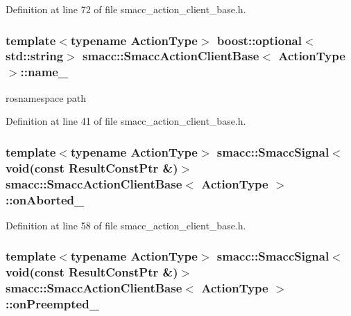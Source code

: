 Definition at line 72 of file smacc\+\_\+action\+\_\+client\+\_\+base.\+h.

\subsubsection[{\texorpdfstring{name\+\_\+}{name_}}]{\setlength{\rightskip}{0pt plus 5cm}template$<$typename Action\+Type$>$ boost\+::optional$<$std\+::string$>$ {\bf smacc\+::\+Smacc\+Action\+Client\+Base}$<$ Action\+Type $>$\+::name\+\_\+}\hypertarget{classsmacc_1_1SmaccActionClientBase_a8464e3ec514e57333339fc538a2203f4}{}\label{classsmacc_1_1SmaccActionClientBase_a8464e3ec514e57333339fc538a2203f4}


rosnamespace path 



Definition at line 41 of file smacc\+\_\+action\+\_\+client\+\_\+base.\+h.

\subsubsection[{\texorpdfstring{on\+Aborted\+\_\+}{onAborted_}}]{\setlength{\rightskip}{0pt plus 5cm}template$<$typename Action\+Type$>$ {\bf smacc\+::\+Smacc\+Signal}$<$void(const Result\+Const\+Ptr \&)$>$ {\bf smacc\+::\+Smacc\+Action\+Client\+Base}$<$ Action\+Type $>$\+::on\+Aborted\+\_\+}\hypertarget{classsmacc_1_1SmaccActionClientBase_a45a892b990b8d61e4f2f5b34181bf16d}{}\label{classsmacc_1_1SmaccActionClientBase_a45a892b990b8d61e4f2f5b34181bf16d}


Definition at line 58 of file smacc\+\_\+action\+\_\+client\+\_\+base.\+h.

\subsubsection[{\texorpdfstring{on\+Preempted\+\_\+}{onPreempted_}}]{\setlength{\rightskip}{0pt plus 5cm}template$<$typename Action\+Type$>$ {\bf smacc\+::\+Smacc\+Signal}$<$void(const Result\+Const\+Ptr \&)$>$ {\bf smacc\+::\+Smacc\+Action\+Client\+Base}$<$ Action\+Type $>$\+::on\+Preempted\+\_\+}\hypertarget{classsmacc_1_1SmaccActionClientBase_abfa809d36c04d3b8d735527867635b1d}{}\label{classsmacc_1_1SmaccActionClientBase_abfa809d36c04d3b8d735527867635b1d}


